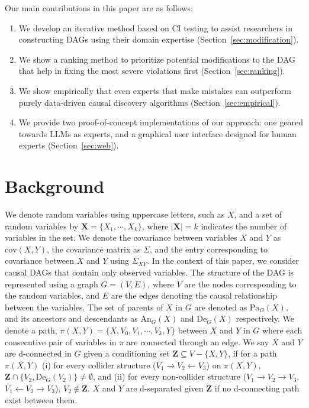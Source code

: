 \documentclass{uai2025} %
\begin{document}
Our main contributions in this paper are as follows:

\begin{enumerate}
    \item We develop an iterative method based on CI testing to assist researchers in 
	    constructing DAGs using their domain expertise (Section~\ref{sec:modification}).
    \item We show a ranking method to prioritize potential modifications to the DAG that 
    	    help in fixing the most severe violations first (Section~\ref{sec:ranking}).
    \item We show empirically that even experts that make mistakes can outperform purely data-driven
	causal discovery algorithms (Section~\ref{sec:empirical}).
    \item We provide two proof-of-concept implementations of our approach: one geared towards
	LLMs as experts, and a graphical user interface designed 
	for human experts (Section~\ref{sec:web}).
\end{enumerate}

\section{Background}
\label{sec:background}
We denote random variables using uppercase letters, such as $ X $, and a set of
random variables by $ \bm{X} = \{X_1, \cdots, X_k\} $, where $ \rvert \bm{X}
\rvert = k $ indicates the number of variables in the set. We denote the
covariance between variables $ X $ and $ Y $ as $ \mathrm{cov}(X, Y) $, the
covariance matrix as $ \Sigma $, and the entry corresponding to covariance
between $ X $ and $ Y $ using $ \Sigma_{XY} $. In the context of this paper, we
consider causal DAGs that contain only observed variables. The structure of the
DAG is represented using a graph $ G = (V, E) $, where $ V $ are the nodes
corresponding to the random variables, and $ E $ are the edges denoting the
causal relationship between the variables. The set of parents of $ X $ in $ G $
are denoted as $ \textrm{Pa}_G(X) $, and its ancestors and descendants as $
\textrm{An}_G(X) $ and $ \textrm{De}_G(X) $ respectively. We denote a path, $
\pi(X, Y) = \{ X, V_0, V_1, \cdots, V_k, Y \} $ between $ X $ and $ Y $ in $ G
$ where each consecutive pair of variables in $ \pi $ are connected through an
edge. We say $ X $ and $ Y $ are d-connected in $ G $ given a conditioning set
$ \bm{Z} \subseteq V - \{X, Y\} $, if for a path $ \pi(X, Y) $ (i) for every
collider structure ($ V_1 \rightarrow V_2 \leftarrow V_3 $) on $ \pi(X, Y) $, $
\bm{Z} \cap \{ V_2, \textrm{De}_G(V_2) \} \ne \emptyset $, and (ii) for every
non-collider structure ($ V_1 \rightarrow V_2 \rightarrow V_3 $, $ V_1
\leftarrow V_2 \rightarrow V_3 $), $ V_2 \not \in \bm{Z} $. $ X $ and $ Y $ are
d-separated given $ \bm{Z} $ if no d-connecting path exist between them.
\end{document}
